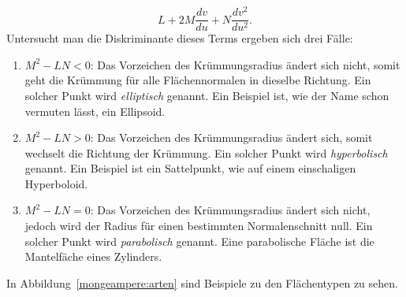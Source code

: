 \begin{equation}
   L + 2M \frac{d v}{d u} + N \frac{d v^2}{d u ^2}.
  \label{mongemapere:dsik}
\end{equation}
Untersucht man die Diskriminante dieses Terms ergeben sich drei Fälle:
%
\begin{enumerate}
  \item $M^2 - LN < 0$: Das Vorzeichen des Krümmungsradius ändert sich nicht, somit geht die Krümmung für alle 
    Flächennormalen in dieselbe Richtung. 
    Ein solcher Punkt wird \emph{elliptisch} genannt. Ein Beispiel ist, wie der 
%
%
%
    Name schon vermuten lässt, ein Ellipsoid.
  \item $M^2 - LN > 0$: Das Vorzeichen des Krümmungsradius ändert sich, somit wechselt die Richtung der Krümmung.
    Ein solcher Punkt wird \emph{hyperbolisch} genannt. Ein Beispiel ist ein Sattelpunkt, wie auf einem einschaligen Hyperboloid.
%
%
%
%
  \item $M^2 - LN = 0$: Das Vorzeichen des Krümmungsradius ändert sich nicht, jedoch wird der Radius für einen 
    bestimmten Normalenschnitt null. 
    Ein solcher Punkt wird \emph{parabolisch} genannt. Eine parabolische Fläche ist die Mantelfäche eines Zylinders. 
%
%
%
%
\end{enumerate}
In Abbildung~\ref{mongeampere:arten} sind Beispiele zu den Flächentypen zu sehen.
